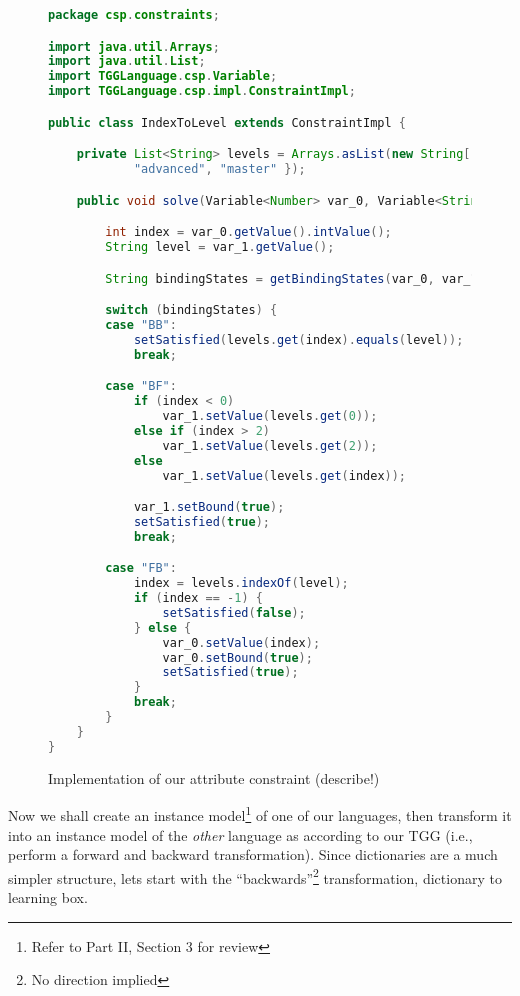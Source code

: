 \begin{figure}[htbp]
\begin{center}
\begin{lstlisting}[language=Java,backgroundcolor=\color{white}, keywordstyle={\bfseries\color{purple}}]
package csp.constraints;

import java.util.Arrays;
import java.util.List;
import TGGLanguage.csp.Variable;
import TGGLanguage.csp.impl.ConstraintImpl;

public class IndexToLevel extends ConstraintImpl {

	private List<String> levels = Arrays.asList(new String[] { "beginner",
			"advanced", "master" });

	public void solve(Variable<Number> var_0, Variable<String> var_1) {

		int index = var_0.getValue().intValue();
		String level = var_1.getValue();

		String bindingStates = getBindingStates(var_0, var_1);

		switch (bindingStates) {
		case "BB":
			setSatisfied(levels.get(index).equals(level));
			break;

		case "BF":
			if (index < 0)
				var_1.setValue(levels.get(0));
			else if (index > 2)
				var_1.setValue(levels.get(2));
			else
				var_1.setValue(levels.get(index));

			var_1.setBound(true);
			setSatisfied(true);
			break;

		case "FB":
			index = levels.indexOf(level);
			if (index == -1) {
				setSatisfied(false);
			} else {
				var_0.setValue(index);
				var_0.setBound(true);
				setSatisfied(true);
			}
			break;
		}
	}
}
\end{lstlisting}
  \caption{Implementation of our attribute constraint \update (describe!)}
  \label{fig:indexToLevel}
\end{center}
\end{figure}

\clearpage

Now we shall create an instance model\footnote{Refer to Part II, Section 3 for review} of one of our languages, then transform it into an instance model of the
\emph{other} language as according to our TGG (i.e., perform a forward and backward transformation). Since dictionaries are a much simpler structure, lets start
with the ``backwards''\footnote{No direction implied} transformation, dictionary to learning box.

